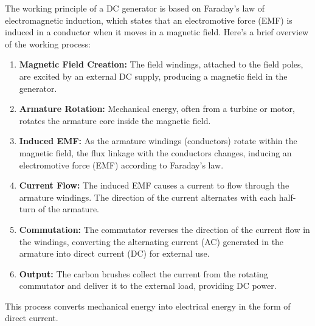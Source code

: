 \documentclass[a4paper,12pt]{article}
\begin{document}
	The working principle of a DC generator is based on Faraday's law of electromagnetic induction, which states that an electromotive force (EMF) is induced in a conductor when it moves in a magnetic field. Here's a brief overview of the working process:
		\begin{enumerate}
	\item \textbf{Magnetic Field Creation:}	 The field windings, attached to the field poles, are excited by an external DC supply, producing a magnetic field in the generator.
		
	\item \textbf{Armature Rotation:}		 Mechanical energy, often from a turbine or motor, rotates the armature core inside the magnetic field.
		
		\item \textbf{Induced EMF:}	 As the armature windings (conductors) rotate within the magnetic field, the flux linkage with the conductors changes, inducing an electromotive force (EMF) according to Faraday's law.
		
		\item \textbf{Current Flow:}	 The induced EMF causes a current to flow through the armature windings. The direction of the current alternates with each half-turn of the armature.
		
		\item \textbf{Commutation: }	The commutator reverses the direction of the current flow in the windings, converting the alternating current (AC) generated in the armature into direct current (DC) for external use.
		
		\item \textbf{Output:}	 The carbon brushes collect the current from the rotating commutator and deliver it to the external load, providing DC power.
		
		\end{enumerate}
	
	This process converts mechanical energy into electrical energy in the form of direct current.
	
\end{document}
